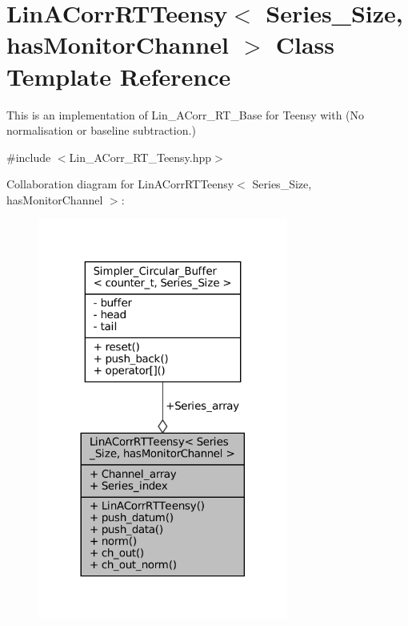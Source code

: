 \hypertarget{classLinACorrRTTeensy}{}\section{Lin\+A\+Corr\+R\+T\+Teensy$<$ Series\+\_\+\+Size, has\+Monitor\+Channel $>$ Class Template Reference}
\label{classLinACorrRTTeensy}


This is an implementation of Lin\+\_\+\+A\+Corr\+\_\+\+R\+T\+\_\+\+Base for Teensy with {\bfseries }(No normalisation or baseline subtraction.)  




{\ttfamily \#include $<$Lin\+\_\+\+A\+Corr\+\_\+\+R\+T\+\_\+\+Teensy.\+hpp$>$}



Collaboration diagram for Lin\+A\+Corr\+R\+T\+Teensy$<$ Series\+\_\+\+Size, has\+Monitor\+Channel $>$\+:\nopagebreak
\begin{figure}[H]
\begin{center}
\leavevmode
\includegraphics[width=233pt]{d4/d4e/classLinACorrRTTeensy__coll__graph}
\end{center}
\end{figure}
